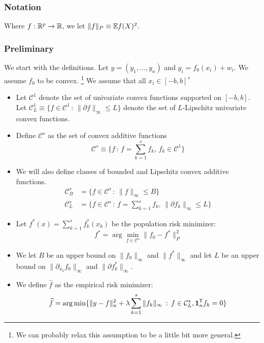 \documentclass{article}
\begin{document}
{\subsubsection{Notation}

Where $f : \mathbb{R}^p \rightarrow \mathbb{R}$, we let $\| f \|_P \equiv \mathbb{E} f(X)^2 $.


\subsubsection{Preliminary}
We start with the definitions. Let $y = (y_1, ..., y_n)$ and $y_i = f_0(x_i) + w_i$. We assume $f_0$ to be convex. \footnote{We can probably relax this assumption to be a little bit more general.} We assume that all $x_i \in [-b, b]^s$ \\

\begin{itemize}

\item Let $\mathcal{C}^1$ denote the set of univariate convex functions supported on $[-b,b]$. Let $\mathcal{C}^1_L \equiv \{ f \in \mathcal{C}^1 \,:\, \| \partial f \|_\infty \leq L \}$ denote the set of $L$-Lipschitz univariate convex functions. \\

\item Define $\mathcal{C}^s$ as the set of convex additive functions
\[
\mathcal{C}^s \equiv \{ f \,:\, f = \sum_{k=1}^s f_k, \,
   f_k \in \mathcal{C}^1 \}
\]
\item We will also define classes of bounded and Lipschitz convex additive functions. 
\begin{align*}
\mathcal{C}^s_B &= \{ f \in \mathcal{C}^s \,:\, 
  \| f \|_\infty \leq B \} \\
\mathcal{C}^s_L &= \{ f \in \mathcal{C}^s \,:\, 
f = \sum_{k=1}^s f_k, \, \| \partial f_k \|_\infty \leq L \}
\end{align*}

\item Let $f^*(x) = \sum_{k=1}^s f^*_k(x_k)$ be the population risk minimizer:
\[
f^* = \arg\min_{f \in \mathcal{C}^s} \| f_0 - f^* \|_P^2
\]

\item We let $B$ be an upper bound on $\|f_0\|_\infty$ and $\| f^* \|_\infty$ and let $L$ be an upper bound on $\| \partial_{x_k} f_0 \|_\infty$ and $\| \partial f^*_k \|_\infty$.

\item We define $\hat{f}$ as the empirical risk minimizer:
\[
\widehat{f} = \arg\min \{ \| y - f \|_n^2 + \lambda \sum_{k=1}^s \| f_k \|_\infty 
    \,:\, f \in \mathcal{C}^s_L, \mathbf{1}_n^{\mathsf{T}} f_k = 0 \}
\]


\end{itemize}}
\end{document}
